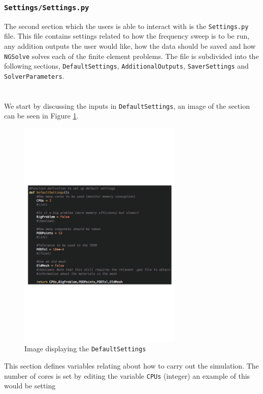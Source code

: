 \subsubsection{\texttt{Settings/Settings.py}}\label{sectSettings.py}
The second section which the users is able to interact with is the \texttt{Settings.py} file. This file contains settings related to how the frequency sweep is to be run, any addition outputs the user would like, how the data should be saved and how \texttt{NGSolve} solves each of the finite element problems. The file is subdivided into the following sections, \texttt{DefaultSettings}, \texttt{AdditionalOutputs}, \texttt{SaverSettings} and \texttt{SolverParameters}.\\
\\
\\
\noindent
We start by discussing the inputs in \texttt{DefaultSettings}, an image of the section can be seen in Figure \ref{fig:DefaultSettings.py}.
\begin{figure}[H]
\begin{center}
\includegraphics[width=0.7\textwidth]{Figures/DefaultSettings}
\caption{Image displaying the \texttt{DefaultSettings}}\label{fig:DefaultSettings.py}
\end{center}
\end{figure}
\noindent
This section defines variables relating about how to carry out the simulation. The number of cores is set by editing the variable \texttt{CPUs} (integer) an example of this would be setting\\

